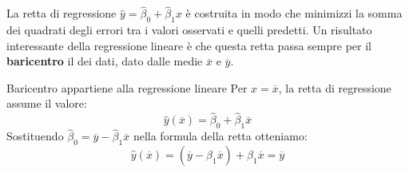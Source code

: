 La retta di regressione \( \hat{y} = \hat{\beta}_0 + \hat{\beta}_1 x \) è costruita in modo che minimizzi la somma dei quadrati degli errori tra i valori osservati e quelli predetti. Un risultato interessante della regressione lineare è che questa retta passa sempre per il \textbf{baricentro} il  dei dati, dato dalle medie \( \overline{x} \) e \( \overline{y} \).

\begin{dimostrazione}{Baricentro appartiene alla regressione lineare}{}
Per \( x = \overline{x} \), la retta di regressione assume il valore:
\[
\hat{y}(\overline{x}) = \hat{\beta}_0 + \hat{\beta}_1 \overline{x}
\]
Sostituendo \( \hat{\beta}_0 = \overline{y} - \hat{\beta}_1 \overline{x} \) nella formula della retta otteniamo:
\[
\hat{y}(\overline{x}) = \left( \overline{y} - \hat{\beta}_1 \overline{x} \right) + \hat{\beta}_1 \overline{x} = \overline{y}
\]
\end{dimostrazione}

